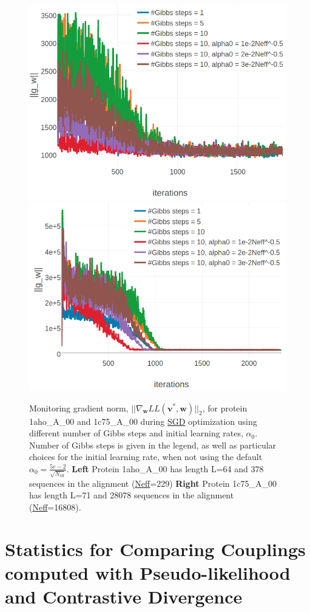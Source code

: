 \documentclass[11pt,a4paper,twoside]{book}
\renewcommand{\v}{\mathbf{v}}
\newcommand{\w}{\mathbf{w}}
\theoremstyle{definition}
\theoremstyle{definition}
\theoremstyle{remark}
\begin{document}
\begin{figure}

{\centering \includegraphics[width=0.48\linewidth]{img/full_likelihood/gibbs_sampling/gradient_norm_1ahoa00} \includegraphics[width=0.48\linewidth]{img/full_likelihood/gibbs_sampling/gradient_norm_1c75a00} 

}

\caption{Monitoring gradient
norm, \(||\nabla_{\w} L\!L(\v^*, \w)||_2\), for protein 1aho\_A\_00 and
1c75\_A\_00 during \protect\hyperlink{abbrev}{SGD} optimization using
different number of Gibbs steps and initial learning rates,
\(\alpha_0\). Number of Gibbs steps is given in the legend, as well as
particular choices for the initial learning rate, when not using the
default \(\alpha_0 = \frac{5e-2}{\sqrt{N_{\text{eff}}}}\). \textbf{Left}
Protein 1aho\_A\_00 has length L=64 and 378 sequences in the alignment
(\protect\hyperlink{abbrev}{Neff}=229) \textbf{Right} Protein
1c75\_A\_00 has length L=71 and 28078 sequences in the alignment
(\protect\hyperlink{abbrev}{Neff}=16808).}\label{fig:cd-gibbssteps-single-proteins-gradient}
\end{figure}

\section{Statistics for Comparing Couplings computed with
Pseudo-likelihood and Contrastive
Divergence}\label{statistics-for-comparing-couplings-computed-with-pseudo-likelihood-and-contrastive-divergence}
\end{document}
